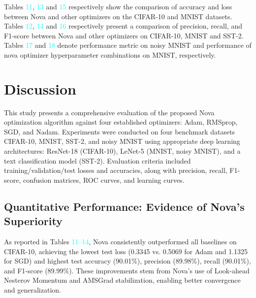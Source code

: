 \documentclass[10pt,twocolumn]{article}
\begin{document}

Tables \textcolor{cyan}{11}, \textcolor{cyan}{13} and \textcolor{cyan}{15}  respectively show the comparison of accuracy and loss between Nova and other optimizers on the CIFAR-10 and MNIST datasets. Tables \textcolor{cyan}{12}, \textcolor{cyan}{14} and \textcolor{cyan}{16} respectively present a comparison of precision, recall, and F1-score between Nova and other optimizers on CIFAR-10,  MNIST and SST-2. Tables \textcolor{cyan}{17} and \textcolor{cyan}{18} denote performance metric on noisy MNIST and performance of nova optimizer hyperparameter combinations on MNIST, respectively.



\section{Discussion}\label{Sec 6}

This study presents a comprehensive evaluation of the proposed Nova optimization algorithm against four established optimizers: Adam, RMSprop, SGD, and Nadam. Experiments were conducted on four benchmark datasets CIFAR-10, MNIST, SST-2, and noisy MNIST using appropriate deep learning architectures: ResNet-18 (CIFAR-10), LeNet-5 (MNIST, noisy MNIST), and a text classification model (SST-2). Evaluation criteria included training/validation/test losses and accuracies, along with precision, recall, F1-score, confusion matrices, ROC curves, and learning curves.

\subsection{Quantitative Performance: Evidence of Nova’s Superiority}

As reported in Tables \textcolor{cyan}{11--14}, Nova consistently outperformed all baselines on CIFAR-10, achieving the lowest test loss (0.3345 vs. 0.5069 for Adam and 1.1325 for SGD) and highest test accuracy (90.01\%), precision (89.98\%), recall (90.01\%), and F1-score (89.99\%). These improvements stem from Nova’s use of Look-ahead Nesterov Momentum and AMSGrad stabilization, enabling better convergence and generalization.
\end{document}
